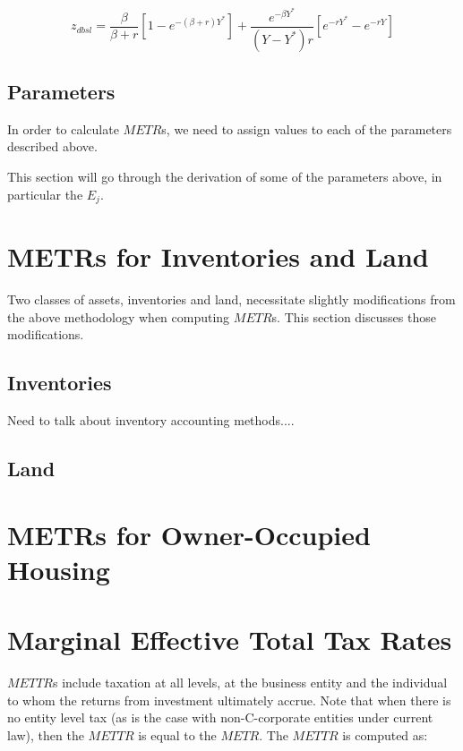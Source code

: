 \documentclass[article,11pt,letterpaper,fleqn]{article}
\theoremstyle{definition}
\numberwithin{equation}{section}
\begin{document}
\begin{equation}
z_{dbsl}=\frac{\beta}{\beta+r}\left[1-e^{-(\beta+r)Y^{*}}\right]+\frac{e^{-\beta Y^{*}}}{(Y-Y^{*})r}\left[e^{-rY^{*}}-e^{-rY}\right]
\end{equation}


\subsection{Parameters}

In order to calculate $METR$s, we need to assign values to each of the parameters described above.  

This section will go through the derivation of some of the parameters above, in particular the $E_{j}$.


\section{METRs for Inventories and Land}

Two classes of assets, inventories and land, necessitate slightly modifications from the above methodology when computing $METR$s.  This section discusses those modifications.

\subsection{Inventories}

Need to talk about inventory accounting methods....

\subsection{Land}



\section{METRs for Owner-Occupied Housing}

\section{Marginal Effective Total Tax Rates}

$METTR$s include taxation at all levels, at the business entity and the individual to whom the returns from investment ultimately accrue.  Note that when there is no entity level tax (as is the case with non-C-corporate entities under current law), then the $METTR$ is equal to the $METR$.  The $METTR$ is computed as:
\end{document}
